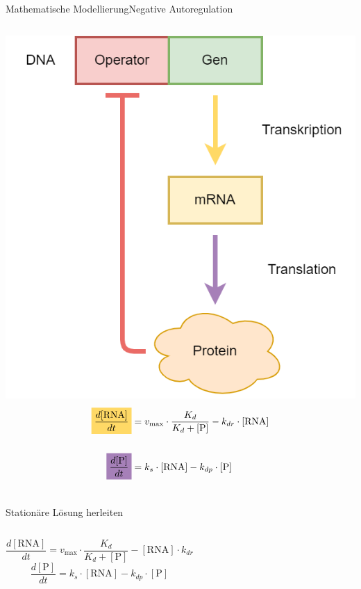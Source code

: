 \documentclass[11pt,aspectratio=169,reqno]{beamer}
\begin{document}
\begin{frame}{Mathematische Modellierung\hfill {\small\textcolor{ETHBlue}{Negative Autoregulation}}}
    \begin{columns}
        \includegraphics[width=\textwidth]{images/repression.png}
        \begin{align*}
            \colorbox[HTML]{FFD966}{$\dfrac{d[\text{RNA}]}{dt}$}&=v_{\text{max}}\cdot\frac{K_d}{K_d+[\text{P}]}-k_{dr}\cdot [\text{RNA}]\\[16pt]
            \colorbox[HTML]{A680B8}{$\dfrac{d[\text{P}]}{dt}$}&=k_s\cdot[\text{RNA}]-k_{dp}\cdot[\text{P}]
        \end{align*}
    \end{columns}
\end{frame}

\begin{frame}[t]{Stationäre Lösung herleiten}
    \begin{columns}[t]
            \[\frac{d[\text{RNA}]}{dt}=v_{\text{max}}\cdot\frac{K_d}{K_d+[\text{P}]}-[\text{RNA}] \cdot k_{dr}\]
            \[\frac{d[\text{P}]}{dt}= k_s\cdot[\text{RNA}]-k_{dp}\cdot[\text{P}]\]
    \end{columns}
\end{frame}
\end{document}
